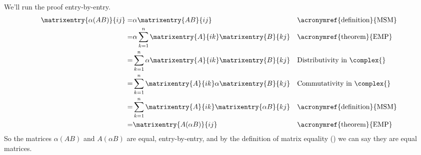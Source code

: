 We'll run the proof entry-by-entry.
%
\begin{align*}
\matrixentry{\alpha(AB)}{ij}=&
\alpha\matrixentry{AB}{ij}&&\text{\acronymref{definition}{MSM}}\\
=&\alpha\sum_{k=1}^{n}\matrixentry{A}{ik}\matrixentry{B}{kj}&&\text{\acronymref{theorem}{EMP}}\\
=&\sum_{k=1}^{n}\alpha\matrixentry{A}{ik}\matrixentry{B}{kj}&&\text{Distributivity in $\complex{\null}$}\\
=&\sum_{k=1}^{n}\matrixentry{A}{ik}\alpha\matrixentry{B}{kj}&&\text{Commutativity in $\complex{\null}$}\\
=&\sum_{k=1}^{n}\matrixentry{A}{ik}\matrixentry{\alpha B}{kj}&&\text{\acronymref{definition}{MSM}}\\
=&\matrixentry{A(\alpha B)}{ij}&&\text{\acronymref{theorem}{EMP}}
\end{align*}
%
So the matrices $\alpha(AB)$ and $A(\alpha B)$ are equal, entry-by-entry, and by the definition of matrix equality () we can say they are equal matrices.
